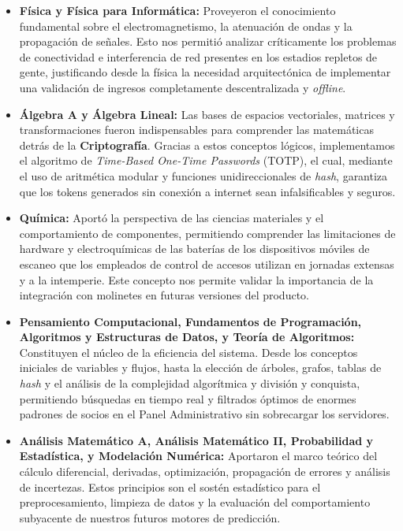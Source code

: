\begin{itemize}
\item \textbf{Física y Física para Informática:} Proveyeron el conocimiento fundamental sobre el electromagnetismo, la atenuación de ondas y la propagación de señales. Esto nos permitió analizar críticamente los problemas de conectividad e interferencia de red presentes en los estadios repletos de gente, justificando desde la física la necesidad arquitectónica de implementar una validación de ingresos completamente descentralizada y \textit{offline}.
\item \textbf{Álgebra A y Álgebra Lineal:} Las bases de espacios vectoriales, matrices y transformaciones fueron indispensables para comprender las matemáticas detrás de la \textbf{Criptografía}. Gracias a estos conceptos lógicos, implementamos el algoritmo de \textit{Time-Based One-Time Passwords} (TOTP), el cual, mediante el uso de aritmética modular y funciones unidireccionales de \textit{hash}, garantiza que los tokens generados sin conexión a internet sean infalsificables y seguros.
\item \textbf{Química:} Aportó la perspectiva de las ciencias materiales y el comportamiento de componentes, permitiendo comprender las limitaciones de hardware y electroquímicas de las baterías de los dispositivos móviles de escaneo que los empleados de control de accesos utilizan en jornadas extensas y a la intemperie. Este concepto nos permite validar la importancia de la integración con molinetes en futuras versiones del producto.
\item \textbf{Pensamiento Computacional, Fundamentos de Programación, Algoritmos y Estructuras de Datos, y Teoría de Algoritmos:} Constituyen el núcleo de la eficiencia del sistema. Desde los conceptos iniciales de variables y flujos, hasta la elección de árboles, grafos, tablas de \textit{hash} y el análisis de la complejidad algorítmica y división y conquista, permitiendo búsquedas en tiempo real y filtrados óptimos de enormes padrones de socios en el Panel Administrativo sin sobrecargar los servidores.
\item \textbf{Análisis Matemático A, Análisis Matemático II, Probabilidad y Estadística, y Modelación Numérica:} Aportaron el marco teórico del cálculo diferencial, derivadas, optimización, propagación de errores y análisis de incertezas. Estos principios son el sostén estadístico para el preprocesamiento, limpieza de datos y la evaluación del comportamiento subyacente de nuestros futuros motores de predicción.
\end{itemize}

